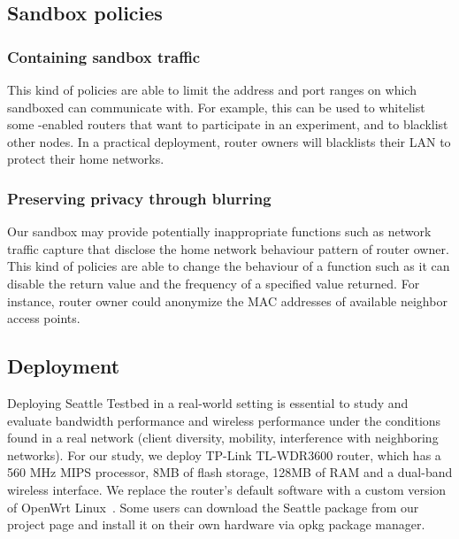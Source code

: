 \subsection{Sandbox policies}
\label{sec.policy}

\subsubsection{Containing sandbox traffic}
This kind of policies are able to limit the address and port ranges on which sandboxed can communicate with. For example, this can be used to whitelist some \sysname -enabled routers that want to participate in an experiment, and to blacklist other nodes. In a practical deployment, router owners will blacklists their LAN to protect their home networks.

\subsubsection{Preserving privacy through blurring}
Our sandbox may provide potentially inappropriate functions such as network traffic capture that disclose the home network behaviour pattern of router owner. This kind of policies are able to change the behaviour of a function such as it can disable the return value and the frequency of a specified value returned. For instance, router owner could anonymize the MAC addresses of available neighbor access points.
 
\subsection{Deployment}
Deploying Seattle Testbed in a real-world setting is essential to study and 
evaluate bandwidth performance and wireless performance under the conditions 
found in a real network (client diversity, mobility, interference with 
neighboring networks). For our study, we deploy TP-Link TL-WDR3600 router, 
which has a 560 MHz MIPS processor, 8MB of flash storage, 128MB of RAM and a 
dual-band wireless interface. We replace the router’s default software with 
a custom version of OpenWrt Linux~\cite{openwrt}. Some users can download 
the Seattle package from our project page and install it on their own 
hardware via opkg package manager.

